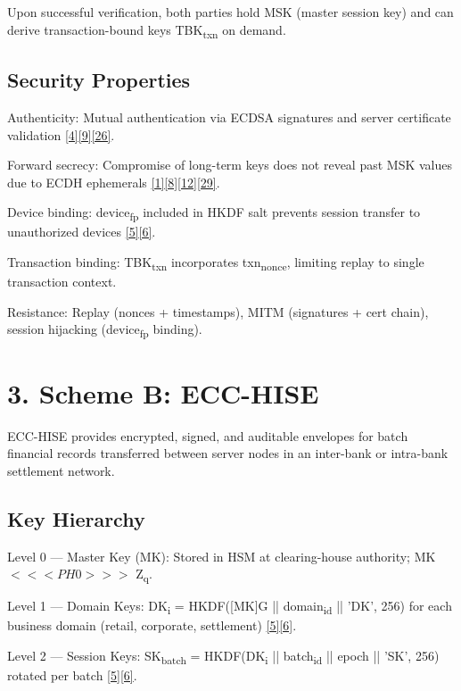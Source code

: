 \indent Upon successful verification, both parties hold MSK (master session key) and can derive transaction-bound keys TBK\textsubscript{txn} on demand.

\subsection{Security Properties}

\indent Authenticity: Mutual authentication via ECDSA signatures and server certificate validation \hyperref[ref:4]{[4]}\hyperref[ref:9]{[9]}\hyperref[ref:26]{[26]}.

\indent Forward secrecy: Compromise of long-term keys does not reveal past MSK values due to ECDH ephemerals \hyperref[ref:1]{[1]}\hyperref[ref:8]{[8]}\hyperref[ref:12]{[12]}\hyperref[ref:29]{[29]}.

\indent Device binding: device\textsubscript{fp} included in HKDF salt prevents session transfer to unauthorized devices \hyperref[ref:5]{[5]}\hyperref[ref:6]{[6]}.

\indent Transaction binding: TBK\textsubscript{txn} incorporates txn\textsubscript{nonce}, limiting replay to single transaction context.

\indent Resistance: Replay (nonces + timestamps), MITM (signatures + cert chain), session hijacking (device\textsubscript{fp} binding).

\section{3. Scheme B: ECC-HISE}

\indent ECC-HISE provides encrypted, signed, and auditable envelopes for batch financial records transferred between server nodes in an inter-bank or intra-bank settlement network.

\subsection{Key Hierarchy}

\indent Level 0 --- Master Key (MK): Stored in HSM at clearing-house authority; MK $<<<PH0>>>$ Z\textsubscript{q}.

\indent Level 1 --- Domain Keys: DK\textsubscript{i} = HKDF([MK]G || domain\textsubscript{id} || 'DK', 256) for each business domain (retail, corporate, settlement) \hyperref[ref:5]{[5]}\hyperref[ref:6]{[6]}.

\indent Level 2 --- Session Keys: SK\textsubscript{batch} = HKDF(DK\textsubscript{i} || batch\textsubscript{id} || epoch || 'SK', 256) rotated per batch \hyperref[ref:5]{[5]}\hyperref[ref:6]{[6]}.

